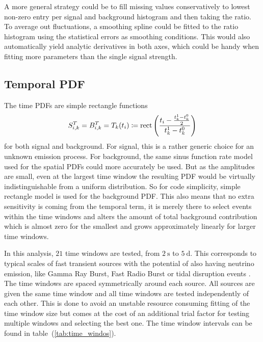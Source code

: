 A more general strategy could be to fill missing values conservatively to lowest non-zero entry per signal and background histogram and then taking the ratio.
To average out fluctuations, a smoothing spline could be fitted to the ratio histogram using the statistical errors as smoothing conditions.
This would also automatically yield analytic derivatives in both axes, which could be handy when fitting more parameters than the single signal strength.

\subsection*{Temporal PDF}
The time PDFs are simple rectangle functions
\begin{equation}
  S_{i,k}^T = B_{i,k}^T = T_k(t_i) \coloneqq
    \operatorname{rect}\left(\frac{t_i - \frac{t_k^1-t_k^0}{2}}
                              {t_k^1-t_k^0}\right)
\end{equation}
for both signal and background.
For signal, this is a rather generic choice for an unknown emission process.
For background, the same sinus function rate model used for the spatial PDFs could more accurately be used.
But as the amplitudes are small, even at the largest time window the resulting PDF would be virtually indistinguishable from a uniform distribution.
So for code simplicity, simple rectangle model is used for the background PDF.
This also means that no extra sensitivity is coming from the temporal term, it is merely there to select events within the time windows and alters the amount of total background contribution which is almost zero for the smallest and grows approximately linearly for larger time windows.

In this analysis, $\num{21}$ time windows are tested, from $\SI{2}{\second}$ to $\SI{5}{\day}$.
This corresponds to typical scales of fast transient sources with the potential of also having neutrino emission, like Gamma Ray Burst, Fast Radio Burst or tidal disruption events .
The time windows are spaced symmetrically around each source.
All sources are given the same time window and all time windows are tested independently of each other.
This is done to avoid an unstable resource consuming fitting of the time window size but comes at the cost of an additional trial factor for testing multiple windows and selecting the best one.
The time window intervals can be found in table~(\ref{tab:time_windos}).

